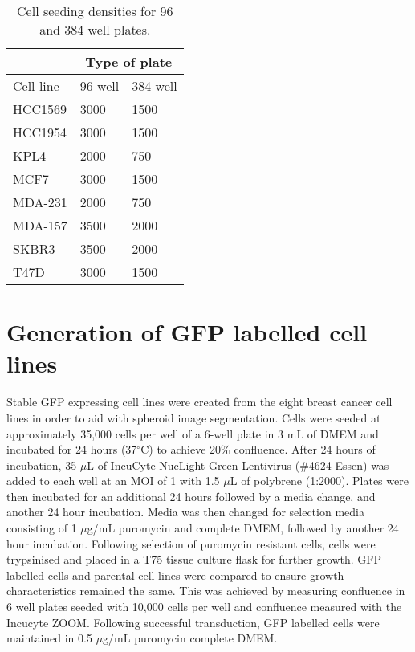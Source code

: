 \documentclass[a4paper,11pt,twoside,openright]{scrbook}
\begin{document}
\begin{table}[h]
\begin{footnotesize}
\begin{tabular}{@{}lll@{}}
\toprule
          & \multicolumn{2}{c}{Type of plate} \\ \midrule
Cell line & 96 well         & 384 well        \\ \midrule
HCC1569   & 3000            & 1500            \\
HCC1954   & 3000            & 1500            \\
KPL4      & 2000            & 750             \\
MCF7      & 3000            & 1500            \\
MDA-231   & 2000            & 750             \\
MDA-157   & 3500            & 2000            \\
SKBR3     & 3500            & 2000            \\
T47D      & 3000            & 1500            \\ \bottomrule
\end{tabular}
\end{footnotesize}
\captionsetup{width=0.8\textwidth}
\caption[Cell seeding densities of 96 and 384 well plates]{
    Cell seeding densities for 96 and 384 well plates.
}
\label{table:well_seeding}
\end{table}


\section{Generation of GFP labelled cell lines}

Stable GFP expressing cell lines were created from the eight breast cancer cell lines in order to aid with spheroid 
image segmentation.
Cells were seeded at approximately 35,000 cells per well of a 6-well plate in 3 mL of DMEM and incubated for 24 hours 
(37$^\circ$C) to achieve 20\% confluence.
After 24 hours of incubation, 35 $\mu$L of IncuCyte NucLight Green Lentivirus (\#4624 Essen) was added to each well at 
an  MOI of 1 with 1.5 $\mu$L of polybrene (1:2000).
Plates were then incubated for an additional 24 hours followed by a media change, and another 24 hour incubation.
Media was then changed for selection media consisting of 1 $\mu$g/mL puromycin and complete DMEM, followed by another 
24 hour incubation.
Following selection of puromycin resistant cells, cells were trypsinised and placed in a T75 tissue culture flask for 
further growth.
GFP labelled cells and parental cell-lines were compared to ensure growth characteristics remained the same.
This was achieved by measuring confluence in 6 well plates seeded with 10,000 cells per well and confluence measured 
with the Incucyte ZOOM.
Following successful transduction, GFP labelled cells were maintained in 0.5 $\mu$g/mL puromycin complete DMEM.
\end{document}
